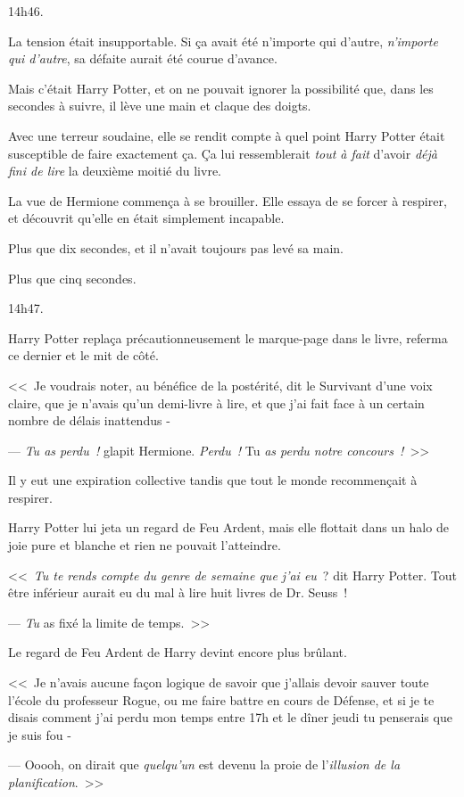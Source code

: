 14h46.

La tension était insupportable. Si ça avait été n'importe qui d'autre, \emph{n'importe qui d'autre}, sa défaite aurait été courue d'avance.

Mais c'était Harry Potter, et on ne pouvait ignorer la possibilité que, dans les secondes à suivre, il lève une main et claque des doigts.

Avec une terreur soudaine, elle se rendit compte à quel point Harry Potter était susceptible de faire exactement ça. Ça lui ressemblerait \emph{tout à fait} d'avoir \emph{déjà fini de lire} la deuxième moitié du livre.

La vue de Hermione commença à se brouiller. Elle essaya de se forcer à respirer, et découvrit qu'elle en était simplement incapable.

Plus que dix secondes, et il n'avait toujours pas levé sa main.

Plus que cinq secondes.

14h47.

Harry Potter replaça précautionneusement le marque-page dans le livre, referma ce dernier et le mit de côté.

<<~Je voudrais noter, au bénéfice de la postérité, dit le Survivant d'une voix claire, que je n'avais qu'un demi-livre à lire, et que j'ai fait face à un certain nombre de délais inattendus -

--- \emph{Tu as perdu~!} glapit Hermione. \emph{Perdu~!} Tu \emph{as perdu notre concours~!}~>>

Il y eut une expiration collective tandis que tout le monde recommençait à respirer.

Harry Potter lui jeta un regard de Feu Ardent, mais elle flottait dans un halo de joie pure et blanche et rien ne pouvait l'atteindre.

<<~\emph{Tu te rends compte du genre de semaine que j'ai eu}~? dit Harry Potter. Tout être inférieur aurait eu du mal à lire huit livres de Dr. Seuss~!

--- \emph{Tu} as fixé la limite de temps.~>>

Le regard de Feu Ardent de Harry devint encore plus brûlant.

<<~Je n'avais aucune façon logique de savoir que j'allais devoir sauver toute l'école du professeur Rogue, ou me faire battre en cours de Défense, et si je te disais comment j'ai perdu mon temps entre 17h et le dîner jeudi tu penserais que je suis fou -

--- Ooooh, on dirait que \emph{quelqu'un} est devenu la proie de l'\emph{illusion de la planification}.~>>

